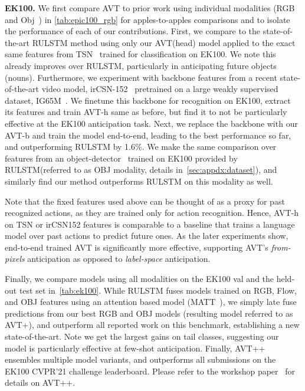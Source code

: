 \documentclass[10pt,twocolumn,letterpaper]{article}
\newcommand{\eknew}{EK100\xspace}
\newcommand{\rulstm}{RULSTM\xspace}
\newcommand{\sota}{state-of-the-art\xspace}
\newcommand{\method}{AVT\xspace}
\newcommand{\methodfused}{AVT+\xspace}
\newcommand{\methodfusedall}{AVT++\xspace}
\newcommand{\txBack}{\method{}-b\xspace}
\newcommand{\txHead}{\method{}-h\xspace}
\begin{document}
 




{\noindent \bf \eknew.}
We first compare \method to prior work using individual modalities (RGB and Obj~\cite{furnari2019rulstm}) in \cref{tab:epic100_rgb} for apples-to-apples comparisons and to isolate the performance of each of our contributions. 
First, we compare to the \sota \rulstm method using only our \method (head) model applied to the exact same features from TSN~\cite{wang2016tsn} trained for classification on \eknew. We note this already improves over \rulstm, particularly in anticipating future objects (nouns). 
Furthermore, we experiment with backbone features from a recent \sota video model, irCSN-152~\cite{tran2019video} pretrained on a large weakly supervised dataset, IG65M~\cite{ghadiyaram2019large}. We finetune this backbone for recognition on \eknew, extract its features and train \txHead same as before, but find it to not be particularly effective at the \eknew anticipation task.
Next, we replace the backbone with our \txBack and train the model end-to-end, leading to the best performance so far, and outperforming \rulstm by 1.6\%. We make the same comparison over features from an object-detector~\cite{ren2015faster} trained on \eknew provided by \rulstm (referred to as OBJ modality, details in~\cref{sec:appdx:dataset}), and similarly find our method outperforms \rulstm on this modality as well. 

Note that the fixed features used above can be thought of as a proxy for past recognized actions, as they are trained only for action recognition. Hence, \txHead on TSN or irCSN152 features is comparable to a baseline that trains a language model over past actions to predict future ones. As the later experiments show, end-to-end trained \method is significantly more effective, supporting \method's \emph{from-pixels} anticipation as opposed to \emph{label-space} anticipation. 

Finally, we compare models using all modalities on the \eknew val and the held-out test set in~\cref{tab:ek100}. While \rulstm fuses models trained on RGB, Flow, and OBJ features using an attention based model (MATT~\cite{furnari2019rulstm}), we simply late fuse predictions from our best RGB and OBJ models (resulting model referred to as \methodfused), and outperform all reported work on this benchmark, establishing a new \sota. Note we get the largest gains on tail classes, suggesting our model is particularly effective at few-shot anticipation. 
Finally, \methodfusedall ensembles multiple model variants, and outperforms all submissions on the \eknew CVPR'21 challenge leaderboard. Please refer to the workshop paper~\cite{girdhar2021avtchallenge} for details on \methodfusedall.
\end{document}
